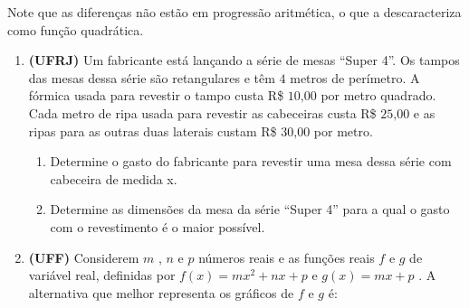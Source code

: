 Note que as diferenças não estão em progressão aritmética, o que a descaracteriza como função quadrática.


\exercise

\begin{enumerate}
\label{\detokenize{AF209-E:sec-funcao-quadratica-exercicios}}\label{\detokenize{AF209-E:exercicios}}\label{\detokenize{AF209-E::doc}}
\item \textbf{(UFRJ)} Um fabricante está lançando a série de mesas  “Super 4”. Os tampos das mesas dessa série são retangulares e têm \(4\) metros de perímetro. A fórmica usada para revestir o tampo custa R\$ $10\text{,}00$ por metro quadrado. Cada metro de ripa usada para revestir as cabeceiras custa R\$ $25\text{,}00$ e as ripas para as outras duas laterais custam R\$ $30\text{,}00$ por metro.
\begin{center}\end{center}\begin{enumerate}
\item {} 
Determine o gasto do fabricante para revestir uma mesa dessa série com cabeceira de medida x.

\item {} 
Determine as dimensões da mesa da série “Super 4” para a qual o gasto com o revestimento é o maior possível.

\end{enumerate}

\item \textbf{(UFF)} Considerem  \(m\) , \(n\)  e  \(p\)  números reais e as funções reais  \(f\)  e  \(g\)  de variável real, definidas por \(f(x)= mx^2+nx+p\)   e   \(g(x) = mx + p\) .  A alternativa que melhor representa os gráficos de  \(f\)  e  \(g\) é:


\end{enumerate}
